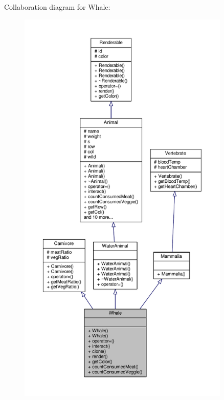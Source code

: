 Collaboration diagram for Whale\+:
\nopagebreak
\begin{figure}[H]
\begin{center}
\leavevmode
\includegraphics[height=550pt]{classWhale__coll__graph}
\end{center}
\end{figure}
